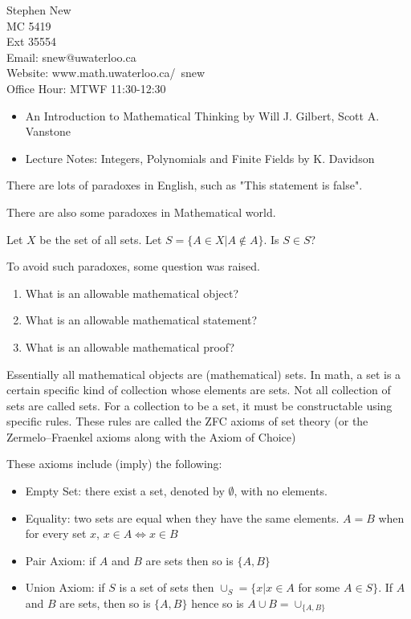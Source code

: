 

Stephen New\\
MC 5419\\
Ext 35554\\
Email: snew@uwaterloo.ca\\
Website: www.math.uwaterloo.ca/~snew\\
Office Hour: MTWF 11:30-12:30

\begin{itemize}
\item An Introduction to Mathematical Thinking by Will J. Gilbert, Scott A. Vanstone
\item Lecture Notes: Integers, Polynomials and Finite Fields by K. Davidson
\end{itemize}



There are lots of paradoxes in English, such as "This statement is false". 

There are also some paradoxes in Mathematical world.




Let $X$ be the set of all sets. Let $S=\{A\in X| A\notin A\}$. Is $S \in S$?

To avoid such paradoxes, some question was raised.
\begin{enumerate}
    \item What is an allowable mathematical object?
	\item What is an allowable mathematical statement?
    \item What is an allowable mathematical proof?
\end{enumerate}

Essentially all mathematical objects are (mathematical) sets. In math, a set is a certain specific kind of collection whose elements are sets. Not all collection of sets are called sets. For a collection to be a set, it must be constructable using specific rules. These rules are called the ZFC axioms of set theory (or the Zermelo–Fraenkel axioms along with the Axiom of Choice)

These axioms include (imply) the following:
\begin{itemize}
    \item Empty Set: there exist a set, denoted by $\emptyset$, with no elements.
    \item Equality: two sets are equal when they have the same elements. $A = B$ when for every set $x$, $x\in A \iff x\in B$
    \item Pair Axiom: if $A$ and $B$ are sets then so is $\{A,B\}$
    \item Union Axiom: if $S$ is a set of sets then $\cup_{S} = \{x|x\in A$ for some $A\in S\} $. If $A$ and $B$ are sets, then so is $\{A,B\}$ hence so is $A\cup B = \cup_{\{A,B\}}$
    
\end{itemize}